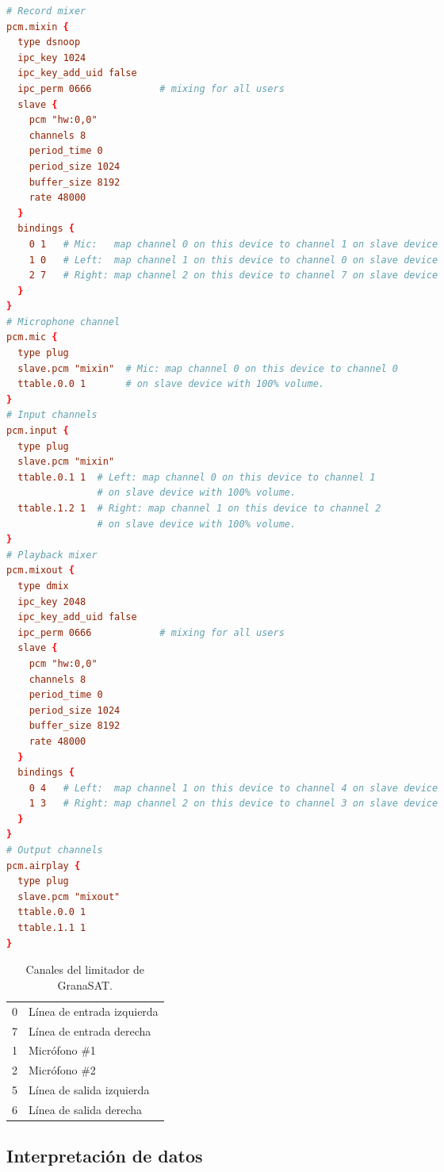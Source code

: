 \begin{lstlisting}[language={conf}, caption={Fichero asound.conf completamente configurado}, label={lst:lms11-asound}]
# Record mixer
pcm.mixin {
  type dsnoop
  ipc_key 1024
  ipc_key_add_uid false
  ipc_perm 0666            # mixing for all users
  slave {
    pcm "hw:0,0"
    channels 8
    period_time 0
    period_size 1024
    buffer_size 8192
    rate 48000
  }
  bindings {
    0 1   # Mic:   map channel 0 on this device to channel 1 on slave device
    1 0   # Left:  map channel 1 on this device to channel 0 on slave device
    2 7   # Right: map channel 2 on this device to channel 7 on slave device
  }
}
# Microphone channel
pcm.mic {
  type plug
  slave.pcm "mixin"  # Mic: map channel 0 on this device to channel 0
  ttable.0.0 1       # on slave device with 100% volume.
}
# Input channels
pcm.input {
  type plug
  slave.pcm "mixin"
  ttable.0.1 1  # Left: map channel 0 on this device to channel 1
                # on slave device with 100% volume.
  ttable.1.2 1  # Right: map channel 1 on this device to channel 2
                # on slave device with 100% volume.
}
# Playback mixer
pcm.mixout {
  type dmix
  ipc_key 2048
  ipc_key_add_uid false
  ipc_perm 0666            # mixing for all users
  slave {
    pcm "hw:0,0"
    channels 8
    period_time 0
    period_size 1024
    buffer_size 8192
    rate 48000
  }
  bindings {
    0 4   # Left:  map channel 1 on this device to channel 4 on slave device
    1 3   # Right: map channel 2 on this device to channel 3 on slave device
  }
}
# Output channels
pcm.airplay {
  type plug
  slave.pcm "mixout"
  ttable.0.0 1
  ttable.1.1 1
}
\end{lstlisting}

\begin{table}[h]
\centering
\begin{tabular}{l|l}
0 & Línea de entrada izquierda \\
7 & Línea de entrada derecha   \\
1 & Micrófono \#1              \\
2 & Micrófono \#2              \\
5 & Línea de salida izquierda  \\
6 & Línea de salida derecha
\end{tabular}
\caption{Canales del limitador de GranaSAT.}
\label{tab:lms11-canales}
\end{table}

\subsection{Interpretación de datos}

